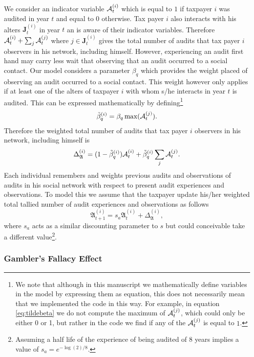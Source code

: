 \documentclass{NSF_proposal_mod}
\begin{document}
We consider an indicator variable ${\cal A}^{(i)}_t$ which is equal to $1$ if taxpayer $i$ was audited in year $t$ and equal to $0$ otherwise. Tax payer $i$ also interacts with his alters ${\mathbf{J}^{(i)}_t}$ in year $t$ an is aware of their indicator variables. Therefore ${\cal A}^{(i)}_t + \sum_j{\cal A}^{(j)}_t$ where ${j \in {\mathbf{J}^{(i)}_t}}$ gives the total number of audits that tax payer $i$ observers in his network, including himself. However, experiencing an audit first hand may carry less wait that observing that an audit occurred to a social contact. Our model considers a parameter $\beta_q$ which provides the weight placed of observing an audit occurred to a social contact. This weight however only applies if at least one of the alters of taxpayer $i$ with whom s/he interacts in year $t$ is audited. This can be expressed mathematically by defining\footnote{We note that although in this manuscript we mathematically define variables in the model by expressing them as equation, this does not necessarily mean that we implemented the code in this way. For example, in equation \ref{eq:tildebeta} we do not compute the maximum of ${\cal A}^{(j)}_t$, which could only be either 0 or 1,  but rather in the code we find if any of the ${\cal A}^{(j)}_t$ is equal to $1$.  }
\begin{equation}
\tilde{\beta}_q^{(i)}= \beta_q \max( {\cal A}^{(j)}_t).
\label{eq:tildebeta}
\end{equation}
Therefore the weighted total number of audits that tax payer $i$ observers in his network, including himself is 
\begin{equation}
\Delta_{\mathfrak A}^{(i)} = (1-\tilde{\beta}_q^{(i)}){\cal A}^{(i)}_t + \tilde{\beta}_q^{(i)}\sum_j{\cal A}^{(j)}_t.
\end{equation} 
Each individual remembers and weights previous audits and observations of audits in his social network  with respect to present audit experiences and observations. To model this we assume that the taxpayer update his/her weighted total tallied number of audit experiences and observations as follows
\begin{equation}
{\mathfrak A}_{t+1}^{(i)}= s_a{\mathfrak A}_t^{(i)}+\Delta_{\mathfrak A}^{(i)},
\end{equation}
where $s_a$ acts as a similar discounting parameter to $s$ but could conceivable take a different value\footnote{Assuming a half life of the experience of being audited of 8 years implies a  value of $s_a=e^{-\log(2)/8}$.}. 

\subsubsection{Gambler's Fallacy  Effect}
\label{Sec:Gambler_Fallacy_Effect}
\end{document}
